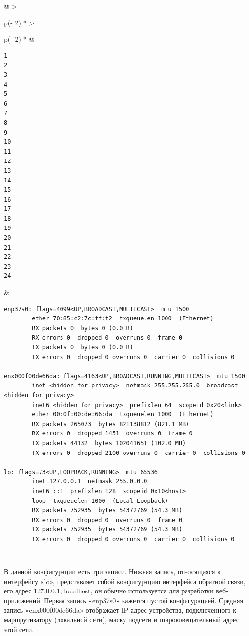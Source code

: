 \documentclass{article}
\begin{document}
\begin{longtable}[]{@{}
  >{\raggedright\arraybackslash}p{(\columnwidth - 2\tabcolsep) * }
  >{\raggedright\arraybackslash}p{(\columnwidth - 2\tabcolsep) * }@{}}
\toprule
\endhead
\begin{minipage}[t]{\linewidth}\raggedright
\begin{verbatim}
1
2
3
4
5
6
7
8
9
10
11
12
13
14
15
16
17
18
19
20
21
22
23
24
\end{verbatim}
\end{minipage} & \begin{minipage}[t]{\linewidth}\raggedright
\begin{verbatim}
enp37s0: flags=4099<UP,BROADCAST,MULTICAST>  mtu 1500
        ether 70:85:c2:7c:ff:f2  txqueuelen 1000  (Ethernet)
        RX packets 0  bytes 0 (0.0 B)
        RX errors 0  dropped 0  overruns 0  frame 0
        TX packets 0  bytes 0 (0.0 B)
        TX errors 0  dropped 0 overruns 0  carrier 0  collisions 0

enx000f00de66da: flags=4163<UP,BROADCAST,RUNNING,MULTICAST>  mtu 1500
        inet <hidden for privacy>  netmask 255.255.255.0  broadcast <hidden for privacy>
        inet6 <hidden for privacy>  prefixlen 64  scopeid 0x20<link>
        ether 00:0f:00:de:66:da  txqueuelen 1000  (Ethernet)
        RX packets 265073  bytes 821138812 (821.1 MB)
        RX errors 0  dropped 1451  overruns 0  frame 0
        TX packets 44132  bytes 102041651 (102.0 MB)
        TX errors 0  dropped 2100 overruns 0  carrier 0  collisions 0

lo: flags=73<UP,LOOPBACK,RUNNING>  mtu 65536
        inet 127.0.0.1  netmask 255.0.0.0
        inet6 ::1  prefixlen 128  scopeid 0x10<host>
        loop  txqueuelen 1000  (Local Loopback)
        RX packets 752935  bytes 54372769 (54.3 MB)
        RX errors 0  dropped 0  overruns 0  frame 0
        TX packets 752935  bytes 54372769 (54.3 MB)
        TX errors 0  dropped 0 overruns 0  carrier 0  collisions 0
\end{verbatim}
\end{minipage} \\ \addlinespace
\bottomrule
\end{longtable}

В данной конфигурации есть три записи. Нижняя запись, относящаяся к
интерфейсу «lo», представляет собой конфигурацию интерфейса обратной
связи, его адрес 127.0.0.1, localhost, он обычно используется для
разработки веб-приложений. Первая запись «enp37s0» кажется пустой
конфигурацией. Средняя запись «enx000f00de66da» отображает IP-адрес
устройства, подключенного к маршрутизатору (локальной сети), маску
подсети и широковещательный адрес этой сети.
\end{document}
